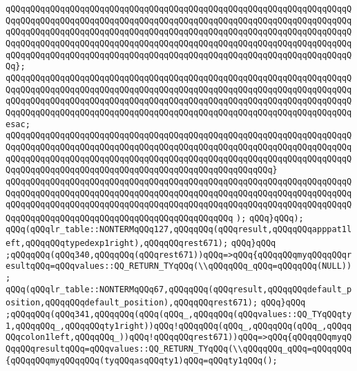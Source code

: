 \verb|qQQqqQQqqQQqqQQqqQQqqQQqqQQqqQQqqQQqqQQqqQQqqQQqqQQqqQQqqQQqqQQqqQQqqQQqqQQqqQQqqQQqqQQqqQQqqQQqqQQqqQQqqQQqqQQqqQQqqQQqqQQqqQQqqQQqqQQqqQQqqQQqqQQqqQQqqQQqqQQqqQQqqQQqqQQqqQQqqQQqqQQqqQQqqQQqqQQqqQQqqQQqqQQqqQQqqQQqqQQqqQQqqQQqqQQqqQQqqQQqqQQqqQQqqQQqqQQqqQQqqQQqqQQqqQQqqQQqqQQqqQQqqQQqqQQqqQQqqQQqqQQqqQQqqQQqqQQqqQQqqQQqqQQqqQQqqQQqqQQqqQQqqQQqqQQq};|\newline
\verb|qQQqqQQqqQQqqQQqqQQqqQQqqQQqqQQqqQQqqQQqqQQqqQQqqQQqqQQqqQQqqQQqqQQqqQQqqQQqqQQqqQQqqQQqqQQqqQQqqQQqqQQqqQQqqQQqqQQqqQQqqQQqqQQqqQQqqQQqqQQqqQQqqQQqqQQqqQQqqQQqqQQqqQQqqQQqqQQqqQQqqQQqqQQqqQQqqQQqqQQqqQQqqQQqqQQqqQQqqQQqqQQqqQQqqQQqqQQqqQQqqQQqqQQqqQQqqQQqqQQqqQQqqQQqqQQqqQQqqQQqesac;|\newline
\verb|qQQqqQQqqQQqqQQqqQQqqQQqqQQqqQQqqQQqqQQqqQQqqQQqqQQqqQQqqQQqqQQqqQQqqQQqqQQqqQQqqQQqqQQqqQQqqQQqqQQqqQQqqQQqqQQqqQQqqQQqqQQqqQQqqQQqqQQqqQQqqQQqqQQqqQQqqQQqqQQqqQQqqQQqqQQqqQQqqQQqqQQqqQQqqQQqqQQqqQQqqQQqqQQqqQQqqQQqqQQqqQQqqQQqqQQqqQQqqQQqqQQqqQQqqQQqqQQqqQQqqQQq}|\newline
\verb|qQQqqQQqqQQqqQQqqQQqqQQqqQQqqQQqqQQqqQQqqQQqqQQqqQQqqQQqqQQqqQQqqQQqqQQqqQQqqQQqqQQqqQQqqQQqqQQqqQQqqQQqqQQqqQQqqQQqqQQqqQQqqQQqqQQqqQQqqQQqqQQqqQQqqQQqqQQqqQQqqQQqqQQqqQQqqQQqqQQqqQQqqQQqqQQqqQQqqQQqqQQqqQQqqQQqqQQqqQQqqQQqqQQqqQQqqQQqqQQqqQQqqQQqqQQqqQQq|\newline
\verb|);|\newline
\verb|qQQq}qQQq);|\newline
\verb|qQQq(qQQqlr_table::NONTERMqQQq127,qQQqqQQq(qQQqresult,qQQqqQQqapppat1left,qQQqqQQqtypedexp1right),qQQqqQQqrest671);|\newline
\verb|qQQq}qQQq|\newline
\verb|;qQQqqQQq(qQQq340,qQQqqQQq(qQQqrest671))qQQq=>qQQq{qQQqqQQqmyqQQqqQQqresultqQQq=qQQqvalues::QQ_RETURN_TYqQQq(\\qQQqqQQq_qQQq=qQQqqQQq(NULL));|\newline
\verb|qQQq(qQQqlr_table::NONTERMqQQq67,qQQqqQQq(qQQqresult,qQQqqQQqdefault_position,qQQqqQQqdefault_position),qQQqqQQqrest671);|\newline
\verb|qQQq}qQQq|\newline
\verb|;qQQqqQQq(qQQq341,qQQqqQQq(qQQq(qQQq_,qQQqqQQq(qQQqvalues::QQ_TYqQQqty1,qQQqqQQq_,qQQqqQQqty1right))qQQq!qQQqqQQq(qQQq_,qQQqqQQq(qQQq_,qQQqqQQqcolon1left,qQQqqQQq_))qQQq!qQQqqQQqrest671))qQQq=>qQQq{qQQqqQQqmyqQQqqQQqresultqQQq=qQQqvalues::QQ_RETURN_TYqQQq(\\qQQqqQQq_qQQq=qQQqqQQq{qQQqqQQqmyqQQqqQQq(tyqQQqasqQQqty1)qQQq=qQQqty1qQQq();|\newline
